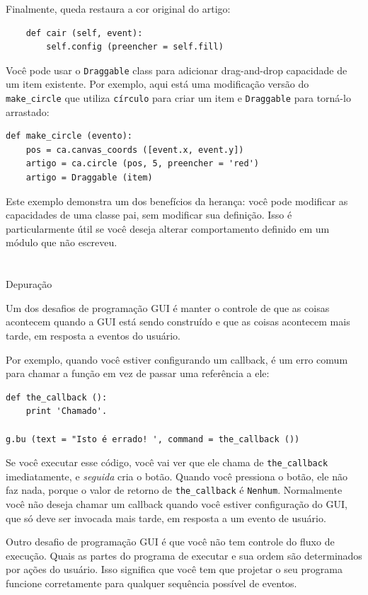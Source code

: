 \documentclass[10pt]{book}
\begin{document}
\begin{exercise}
\begin{v erbatim}
Finalmente, {queda \tt} restaura a cor original do artigo:

\begin{verbatim}
    def cair (self, event):
        self.config (preencher = self.fill)
\end{verbatim}
%
Você pode usar o {\tt Draggable} class para adicionar drag-and-drop
capacidade de um item existente. Por exemplo, aqui está uma modificação
versão do \verb "make_circle" que utiliza {\tt círculo} para criar
um item e {\tt Draggable} para torná-lo arrastado:

\begin{verbatim}
def make_circle (evento):
    pos = ca.canvas_coords ([event.x, event.y])
    artigo = ca.circle (pos, 5, preencher = 'red')
    artigo = Draggable (item)
\end{verbatim}
%
Este exemplo demonstra um dos benefícios da herança: você pode
modificar as capacidades de uma classe pai, sem modificar sua
definição. Isso é particularmente útil se você deseja alterar
comportamento definido em um módulo que não escreveu.


\section{} Depuração

Um dos desafios de programação GUI é manter o controle de
que as coisas acontecem quando a GUI está sendo construído e que
as coisas acontecem mais tarde, em resposta a eventos do usuário.

Por exemplo, quando você estiver configurando um callback, é um erro comum
para chamar a função em vez de passar uma referência a ele:

\begin{verbatim}
def the_callback ():
    print 'Chamado'.

g.bu (text = "Isto é errado! ', command = the_callback ())
\end{verbatim}
%
Se você executar esse código, você vai ver que ele chama de \verb "the_callback"
imediatamente, e {\em seguida} cria o botão. Quando você pressiona o
botão, ele não faz nada, porque o valor de retorno de 
\Verb "the_callback" é {\tt Nenhum}.
Normalmente você não deseja chamar um callback quando você estiver
configuração do GUI, que só deve ser invocada mais tarde, em resposta a
um evento de usuário.

Outro desafio de programação GUI é que você não tem controle
do fluxo de execução. Quais as partes do programa de executar
e sua ordem são determinados por ações do usuário.
Isso significa que você tem que projetar o seu programa funcione corretamente
para qualquer sequência possível de eventos.


\end{v erbatim}
\end{exercise}
\end{document}
